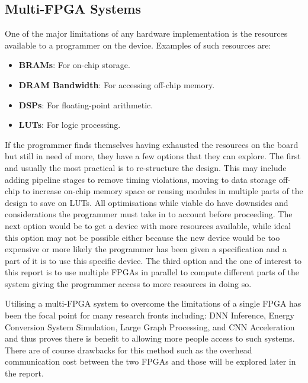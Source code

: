 \subsection{Multi-FPGA Systems}

One of the major limitations of any hardware implementation is the resources available to a programmer on the device. Examples of such resources are:

\begin{itemize}
    \item \textbf{BRAMs}: For on-chip storage.
    \item \textbf{DRAM Bandwidth}: For accessing off-chip memory.
    \item \textbf{DSPs}: For floating-point arithmetic.
    \item \textbf{LUTs}: For logic processing.
\end{itemize}

If the programmer finds themselves having exhausted the resources on the board but still in need of more, they have a few options that they can explore. The first and usually the most practical is to re-structure the design. This may include adding pipeline stages to remove timing violations, moving to data storage off-chip to increase on-chip memory space or reusing modules in multiple parts of the design to save on LUTs. All optimisations while viable do have downsides and considerations the programmer must take in to account before proceeding. The next option would be to get a device with more resources available, while ideal this option may not be possible either because the new device would be too expensive or more likely the programmer has been given a specification and a part of it is to use this specific device. The third option and the one of interest to this report is to use multiple FPGAs in parallel to compute different parts of the system giving the programmer access to more resources in doing so.

Utilising a multi-FPGA system to overcome the limitations of a single FPGA has been the focal point for many research fronts including: DNN Inference\cite{10.1145/3358192}, Energy Conversion System Simulation\cite{8822485}, Large Graph Processing\cite{10.1145/3020078.3021739}, and CNN Acceleration \cite{10.1145/3337821.3337846} and thus proves there is benefit to allowing more people access to such systems. There are of course drawbacks for this method such as the overhead communication cost between the two FPGAs and those will be explored later in the report.


